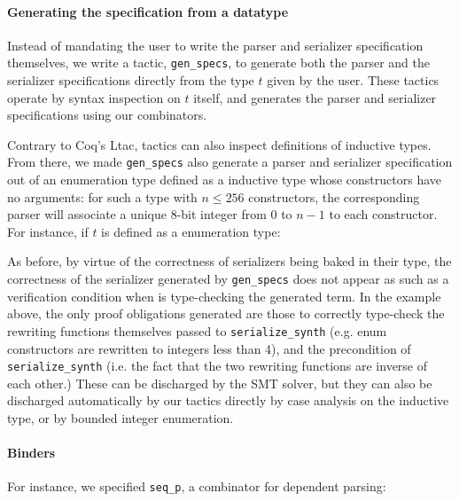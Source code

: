 
\paragraph{\bf Generating the specification from a \fstar datatype}

Instead of mandating the user to write the parser and serializer
specification themselves, we write a \metafstar
tactic, \verb+gen_specs+, to generate both
the parser and the serializer specifications directly from the \fstar
type $t$ given by the user. These tactics operate by syntax inspection
on $t$ itself, and generates the parser and serializer specifications
using our combinators.

Contrary to Coq's Ltac, \metafstar tactics can also inspect
definitions of inductive types. From there, we made \verb+gen_specs+
also generate a parser and serializer specification out of an
enumeration type defined as a \fstar inductive type whose constructors
have no arguments: for such a type with $n \leq 256$ constructors, the
corresponding parser will associate a unique 8-bit integer from $0$ to
$n-1$ to each constructor. For instance, if $t$ is defined as a \fstar
enumeration type:

As before, by virtue of the correctness of serializers being baked in
their type, the correctness of the serializer generated
by \verb+gen_specs+ does not appear as such as a verification
condition when \fstar is type-checking the generated term. In the
example above, the only proof obligations generated are those to
correctly type-check the rewriting functions themselves passed
to \verb+serialize_synth+ (e.g. enum constructors are rewritten to
integers less than 4), and the precondition of \verb+serialize_synth+
(i.e. the fact that the two rewriting functions are inverse of each
other.) These can be discharged by the SMT solver, but they can also
be discharged automatically by our tactics directly by case analysis
on the inductive type, or by bounded integer enumeration.

\paragraph{\bf Binders}

For instance, we specified \verb+seq_p+, a combinator for dependent
parsing: 


